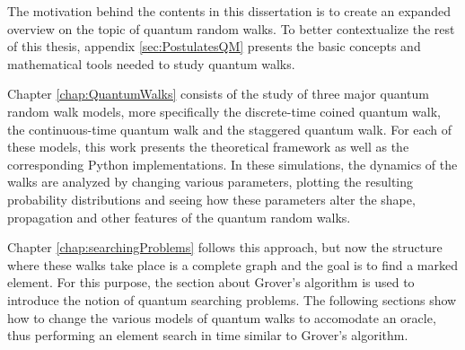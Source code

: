 \documentclass[../../dissertation.tex]{subfiles}
\begin{document}
The motivation behind the contents in this dissertation is to create an
expanded overview on  the topic of quantum random walks. To better
contextualize the rest of this thesis, appendix \ref{sec:PostulatesQM} presents
the basic concepts and mathematical tools needed to study quantum walks. \par

Chapter \ref{chap:QuantumWalks} consists of the study of three major quantum
random walk models, more specifically the discrete-time coined quantum walk,
the continuous-time quantum walk and the staggered quantum walk. For each of
these models, this work presents the theoretical framework as well as the corresponding Python
implementations. In these simulations, the dynamics of the walks are analyzed
by changing various parameters, plotting the resulting probability
distributions and seeing how these parameters alter the shape, propagation and
other features of the quantum random walks.\par

Chapter \ref{chap:searchingProblems} follows this approach, but now the
structure where these walks take place is a complete graph and the goal is to
find a marked element. For this purpose, the section about Grover's algorithm
is used to introduce the notion of quantum searching problems. The following
sections show how to change the various models of quantum walks to accomodate
an oracle, thus performing an element search in time similar to Grover's
algorithm. \par
\end{document}
